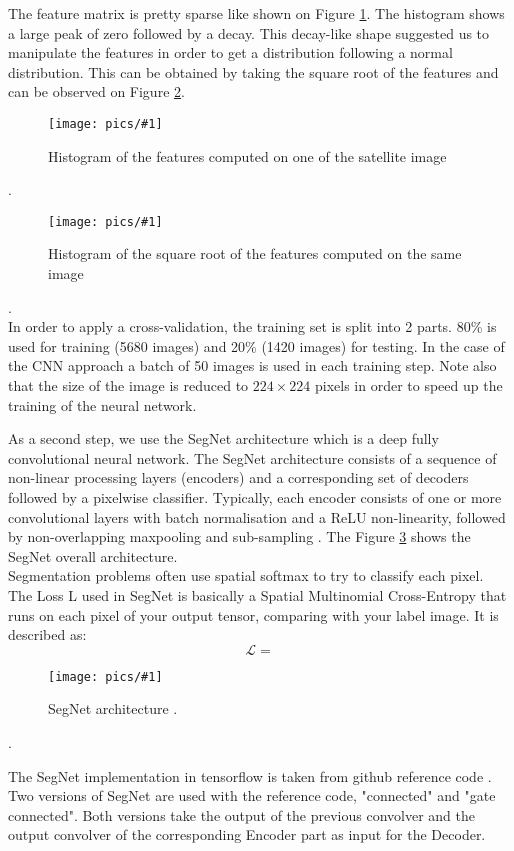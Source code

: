 \documentclass[10pt,conference,compsocconf]{IEEEtran}
\newcommand{\scalefig}[4]{
  \begin{figure}[ht!]
    \centering
    \texttt{[image: pics/\#1]}
 \caption{#3}
    \label{#4}
  \end{figure}}
\newcommand{\Lagr}{\mathcal{L}}
\begin{document}
The feature matrix is pretty sparse like shown on Figure \ref{fig:hist_feats}. The histogram shows a large peak of zero followed by a decay. This decay-like shape suggested us to manipulate the features in order to get a distribution following a normal distribution. This can be obtained by taking the square root of the features and can be observed on Figure \ref{fig:hist_sqrt_feats}.
\scalefig{hist_feats}{1}{Histogram of the features computed on one of the satellite image}{fig:hist_feats}.\\
\scalefig{hist_sqrt_feats}{1}{Histogram of the square root of the features computed on the same image}{fig:hist_sqrt_feats}.\\

In order to apply a cross-validation, the training set is split into 2 parts. 80\%  is used for training (5680 images) and 20\% (1420 images) for testing. 
In the case of the CNN approach a batch of 50 images is used in each training step. Note also that the size of the image is reduced to $224 \times 224$ pixels in order to speed up the training of the neural network.

%   

As a second step, we use the SegNet architecture which is a deep fully convolutional neural network. The SegNet architecture consists of a sequence of non-linear processing layers (encoders) and a corresponding set of decoders followed by a pixelwise classifier. Typically, each encoder consists of one or more convolutional layers with batch normalisation and a ReLU non-linearity, followed by non-overlapping maxpooling and sub-sampling  \cite{segnet2}. The Figure \ref{fig:segnet_arch} shows the SegNet overall architecture.\\
Segmentation problems often use spatial softmax to try to classify each pixel. The Loss L used in SegNet is basically a Spatial Multinomial Cross-Entropy that runs on each pixel of your output tensor, comparing 
with your label image. It is described as:
\begin{equation}
\Lagr = 
\end{equation}
\scalefig{segnet}{1}{SegNet architecture \cite{segnet2}.}{fig:segnet_arch}.

The SegNet implementation in tensorflow is taken from github reference code \cite{leo}. Two versions of SegNet are used with the reference code, "connected" and "gate connected". Both versions take the output of the previous convolver and the output convolver of the corresponding Encoder part as input for the Decoder. 
 
\end{document}

